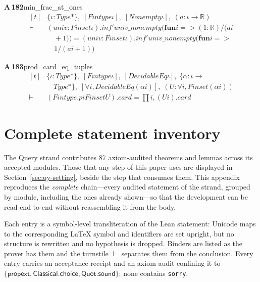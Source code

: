 \documentclass[conference]{IEEEtran}
\theoremstyle{definition}
\newcommand{\lean}[1]{\textsf{\footnotesize #1}}
\begin{document}
\noindent\textbf{A\,182}\quad\lean{min\_frac\_at\_ones}
{\footnotesize\[ \begin{aligned}[t]
&\{ \iota : \mathit{Type}*\},\; [\mathit{Fintype} \iota ],\; [\mathit{Nonempty} \iota ],\; (\mathit{a} : \iota \to \mathbb{R} )\\
\vdash\;&(\mathit{univ} : \mathit{Finset} \iota ).\mathit{inf'} \mathit{univ\_nonempty} (\mathbf{fun} \mathit{i} => (1:\mathbb{R} )/(\mathit{a} \mathit{i}\\
&\quad + 1)) = (\mathit{univ} : \mathit{Finset} \iota ).\mathit{inf'} \mathit{univ\_nonempty} (\mathbf{fun} \mathit{i} =>\\
&\quad 1/(\mathit{a} \mathit{i} + 1))
\end{aligned} \]}

\noindent\textbf{A\,183}\quad\lean{prod\_card\_eq\_tuples}
{\footnotesize\[ \begin{aligned}[t]
&\{ \iota : \mathit{Type}*\},\; [\mathit{Fintype} \iota ],\; [\mathit{DecidableEq} \iota ],\; \{ \alpha : \iota \to\\
&\quad \mathit{Type}*\},\; [\forall \mathit{i}, \mathit{DecidableEq} (\alpha \mathit{i})],\; (\mathit{U} : \forall \mathit{i}, \mathit{Finset} (\alpha \mathit{i}))\\
\vdash\;&(\mathit{Fintype}.\mathit{piFinset} \mathit{U}).\mathit{card} = \textstyle\prod \mathit{i}, (\mathit{U} \mathit{i}).\mathit{card}
\end{aligned} \]}

\section{Complete statement inventory}
\label{app:qy-inventory}

The Query strand contributes $87$ axiom-audited theorems and lemmas across its accepted modules. Those that any step of this paper uses are displayed in Section~\ref{sec:qy-setting}, beside the step that consumes them. This appendix reproduces the \emph{complete} chain---every audited statement of the strand, grouped by module, including the ones already shown---so that the development can be read end to end without reassembling it from the body.

Each entry is a symbol-level transliteration of the Lean statement: Unicode maps to the corresponding \LaTeX{} symbol and identifiers are set upright, but no structure is rewritten and no hypothesis is dropped. Binders are listed as the prover has them and the turnstile $\vdash$ separates them from the conclusion. Every entry carries an acceptance receipt and an axiom audit confining it to $\{\textsf{propext},\textsf{Classical.choice},\textsf{Quot.sound}\}$; none contains \texttt{sorry}.
\end{document}
